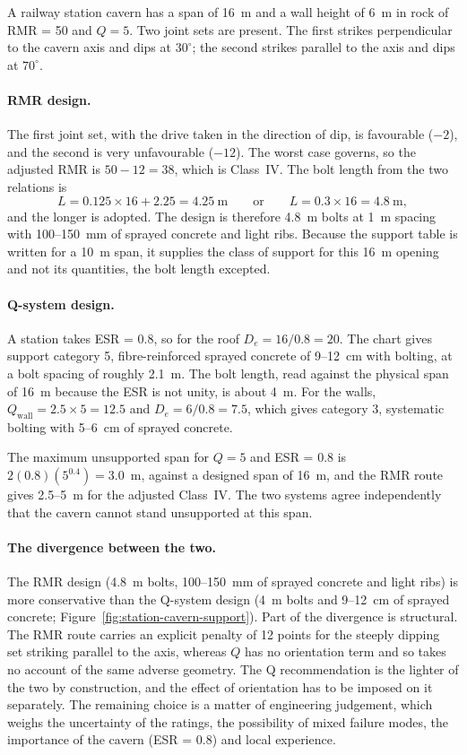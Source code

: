 A railway station cavern has a span of 16~m and a wall height of 6~m in rock
of RMR = 50 and $Q = 5$. Two joint sets are present. The first strikes
perpendicular to the cavern axis and dips at $30^\circ$; the second strikes
parallel to the axis and dips at $70^\circ$.

\paragraph{RMR design.}
The first joint set, with the drive taken in the direction of dip, is
favourable ($-2$), and the second is very unfavourable ($-12$). The worst
case governs, so the adjusted RMR is $50 - 12 = 38$, which is Class~IV. The
bolt length from the two relations is
\[
L = 0.125\times16 + 2.25 = 4.25~\text{m}
\qquad \text{or} \qquad
L = 0.3\times16 = 4.8~\text{m} ,
\]
and the longer is adopted. The design is therefore 4.8~m bolts at 1~m
spacing with 100--150~mm of sprayed concrete and light ribs. Because the support
table is written for a 10~m span, it supplies the class of support for this
16~m opening and not its quantities, the bolt length excepted.

\paragraph{Q-system design.}
A station takes ESR = 0.8, so for the roof $D_e = 16/0.8 = 20$. The chart
gives support category 5, fibre-reinforced sprayed concrete of 9--12~cm with
bolting, at a bolt spacing of roughly 2.1~m. The bolt length, read against
the physical span of 16~m because the ESR is not unity, is about 4~m. For the
walls, $Q_{\text{wall}} = 2.5\times 5 = 12.5$ and $D_e = 6/0.8 = 7.5$, which
gives category 3, systematic bolting with 5--6~cm of sprayed concrete.

The maximum unsupported span for $Q = 5$ and ESR = 0.8 is
$2(0.8)(5^{0.4}) = 3.0$~m, against a designed span of 16~m, and the RMR route
gives 2.5--5~m for the adjusted Class~IV. The two systems agree
independently that the cavern cannot stand unsupported at this span.

\paragraph{The divergence between the two.}
The RMR design (4.8~m bolts, 100--150~mm of sprayed concrete and light ribs) is more
conservative than the Q-system design (4~m bolts and 9--12~cm of sprayed concrete;
Figure~\ref{fig:station-cavern-support}).
Part of the divergence is structural. The RMR route carries an explicit
penalty of 12 points for the steeply dipping set striking parallel to the
axis, whereas $Q$ has no orientation term and so takes no account of the
same adverse geometry. The Q recommendation is the lighter of the two by
construction, and the effect of orientation has to be imposed on it
separately. The remaining choice is a matter of engineering judgement, which
weighs the uncertainty of the ratings, the possibility of mixed failure
modes, the importance of the cavern (ESR = 0.8) and local experience.

